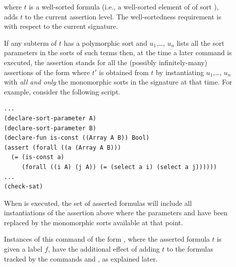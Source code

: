 \begin{description}
%
\item[]
where $t$ is a well-sorted formula 
(i.e., a well-sorted element of  of sort ),
adds $t$ to the current assertion level.
The well-sortedness requirement is with respect to the current signature.

If any subterm of $t$ has a polymorphic sort
and $u_1$,\ldots, $u_n$ lists all the sort parameters in the sorts of such terms 
then, at the time a later  command is executed,
the assertion stands for all the (possibly infinitely-many) assertions of the form 
 where $t'$ is obtained from $t$ by instantiating
$u_1$,\ldots, $u_n$ with \emph{all and only} the monomorphic sorts 
in the signature at that time.
For example, consider the following script.

\begin{lstlisting}
...
(declare-sort-parameter A)
(declare-sort-parameter B)
(declare-fun is-const ((Array A B)) Bool)
(assert (forall ((a (Array A B))) 
  (= (is-const a) 
     (forall ((i A) (j A)) (= (select a i) (select a j))))))
...
(check-sat)
\end{lstlisting}
When  is executed, 
the set of asserted formulas will include all instantiations of the assertion above 
where the parameters  and  
have been replaced by the monomorphic sorts available at that point.

Instances of this command of the form , 
where the asserted formula $t$ is given a label $f$, 
have the additional effect of adding $t$ to the formulas tracked 
by the commands  and , as explained later.


\end{description}
